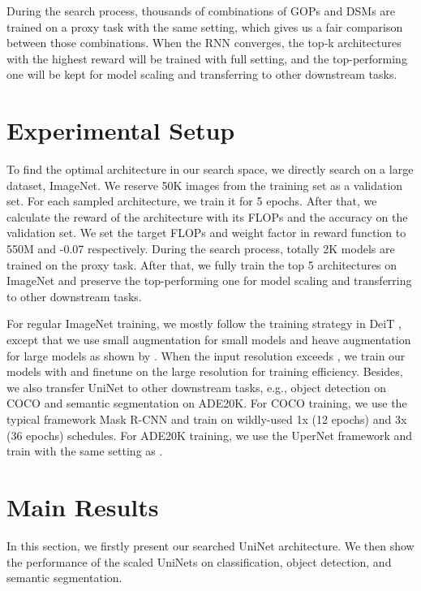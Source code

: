 \documentclass{article} \usepackage{iclr2022_conference,times}
\begin{document}
During the search process, thousands of combinations of GOPs and DSMs are trained on a proxy task with the same setting, which gives us a fair comparison between those combinations.  When the RNN converges, the top-k architectures with the highest reward will be trained with full setting, and the top-performing one will be kept for model scaling and transferring to other downstream tasks.


\section{Experimental Setup}

To find the optimal architecture in our search space, we directly search on a large dataset, ImageNet. We reserve 50K images from the training set as a validation set. For each sampled architecture, we train it for 5 epochs. After that, we calculate the reward of the architecture with its FLOPs and the accuracy on the validation set. We set the target FLOPs  and weight factor  in reward function to 550M and -0.07 respectively. During the search process, totally 2K models are trained on the proxy task. After that, we fully train the top 5 architectures on ImageNet and preserve the top-performing one for model scaling and transferring to other downstream tasks.

For regular ImageNet training, we mostly follow the training strategy in DeiT \citep{deit}, except that we use small augmentation for small models and heave augmentation for large models as shown by \citet{trainvit}. When the input resolution exceeds , we train our models with  and finetune on the large resolution for training efficiency. Besides, we also transfer UniNet to other downstream tasks, e.g., object detection on COCO and semantic segmentation on ADE20K.
For COCO training, we use the typical framework Mask R-CNN and train on wildly-used 1x (12 epochs) and 3x (36 epochs) schedules. For ADE20K training, we use the UperNet framework and train with the same setting as \citet{swin}.

\section{Main Results}
\label{main_results}


In this section, we firstly present our searched UniNet architecture. We then show the performance of the scaled UniNets on classification, object detection, and semantic segmentation.
\end{document}

